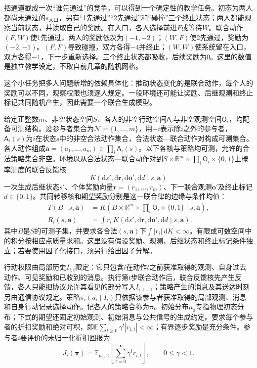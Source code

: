 把通道截成一次“谁先通过”的竞争，可以得到一个确定性的教学任务。初态为两人都尚未通过的$s_{\text{入口}}$，另有“1先通过”“2先通过”和“碰撞”三个终止状态；两人都能观察当前状态，并读取自己的奖励。在入口，各人选择前进$F$或等待$W$。联合动作$(F,W)$使1先通过，两人的奖励依次为$(-1,-2)$；$(W,F)$使2先通过，奖励为$(-2,-1)$。$(F,F)$导致碰撞，双方各得$-4$并终止；$(W,W)$使系统留在入口，双方各得$-1$，下一步重新选择。三个终止状态都吸收，后续奖励为0。这里的数值是独立教学设定，不取自前几章的随机网格。

这个小任务把多人问题新增的依赖具体化：推动状态变化的是联合动作，每个人的奖励可以不同，观察权限也须逐人规定。一般环境还可能让奖励、后继观测和终止标记共同随机产生，因此需要一个联合生成模型。

\begin{definition}[多参与者序贯决策]
\label{def:rl-multi-agent-game}
给定正整数$m$、非空状态空间$S$、各人的非空行动空间$\mathsf A_i$与非空观测空间$\mathsf O_i$，均配备可测结构。设参与者集合为$\mathcal N=\{1,\ldots,m\}$，用$-i$表示除$i$之外的参与者，$\mathsf A_i(s)$为$i$在状态$s$中的非空合法动作集合，合法状态—联合动作对构成可测集合。各人动作组成$\bm a=(a_1,\ldots,a_m)\in\prod_i\mathsf A_i(s)$。以下各核与策略均可测，允许的合法策略集合非空。环境以从合法状态—联合动作对到$S\times\mathbb R^m\times\prod_i\mathsf O_i\times\{0,1\}$上概率测度的联合反馈核
\[
 K(\mathrm ds',\mathrm d\bm r,\mathrm d\bm o',\mathrm dd\mid s,\bm a)
\]
一次生成后继状态$s'$、个体奖励向量$\bm r=(r_1,\ldots,r_m)$、下一联合观测$\bm o'$及终止标记$d\in\{0,1\}$。共同转移核和期望奖励分别是这一联合律的边缘与条件均值：
\[
 \begin{aligned}
 T(B\mid s,\bm a)
 &=K\!\left(B\times\mathbb R^m\times\prod_i\mathsf O_i
              \times\{0,1\}\mid s,\bm a\right),\\
 R_i(s,\bm a)
 &=\int r_i\,K(\mathrm ds',\mathrm d\bm r,\mathrm d\bm o',\mathrm dd\mid s,\bm a).
 \end{aligned}
\]
其中$B$是$S$的可测子集，并要求各合法$(s,\bm a)$下$\int|r_i|\,\mathrm dK<\infty$。有限或可数空间中的积分按相应点质量求和。这里没有假设奖励、观测、后继状态和终止标记条件独立；若要使用因子化接口，须另行给出因子分解。

行动权限由局部历史$I_{i,t}$限定：它只包含$i$在动作$t$之前获准取得的观测、自身过去动作、可见奖励和已收到的消息。执行第$t$步联合动作后，联合反馈核先产生反馈，各人只能把协议允许其看见的部分写入$I_{i,t+1}$；策略产生的消息及其送达时刻另由通信协议规定。策略$\pi_i(a_i\mid I_i)$只依据该参与者获准取得的局部观测、消息和自身行动记录选择动作。记各人的策略合称为$\bm\pi$。初始分布$\mu_0$专指物理初态分布；下式的期望还固定初始观测、初始消息与公共信号的生成约定。要求每个参与者的折扣奖励和绝对可积，即$\mathbb E\sum_{t\geq0}\gamma^t|r_{i,t}|<\infty$；有界逐步奖励是充分条件。参与者$i$要评价的未归一化折扣回报为
\[
 J_i(\bm\pi)=\mathbb E_{\mu_0,\bm\pi}
 \left[\sum_{t=0}^{\infty}\gamma^t r_{i,t}\right],
 \qquad 0\leq\gamma<1.
\]
\end{definition}

